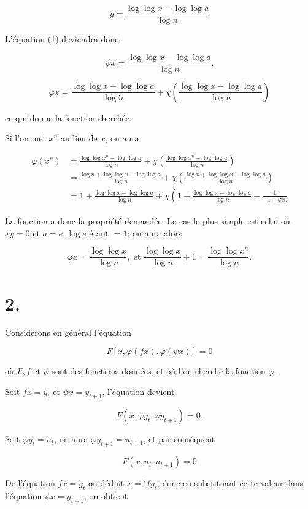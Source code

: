 \documentclass{article}
\begin{document}
\[
y=\frac{\log \log x-\log \log a}{\log n}
\]

L'équation (1) deviendra done

\[
\psi x=\frac{\log \log x-\log \log a}{\log n} .
\]

\[
\varphi x=\frac{\log \log x-\log \log a}{\log \dot{n}}+\chi\left(\frac{\log \log x-\log \log a}{\log n}\right)
\]

ce qui donne la fonction cherchée.

Si l'on met \(x^{n}\) au lieu de \(x\), on aura

\[
\begin{aligned}
\varphi\left(x^{n}\right) & =\frac{\log \log x^{n}-\log \log a}{\log n}+\chi\left(\frac{\log \log x^{n}-\log \log a}{\log n}\right) \\
& =\frac{\log n+\log \log x-\log \log a}{\log n}+\chi\left(\frac{\log n+\log \log x-\log \log a}{\log n}\right) \\
& =1+\frac{\log \log x-\log \log a}{\log n}+\chi\left(1+\frac{\log \log x-\log \log a}{\log n}-\frac{1}{-1+\varphi x .}\right.
\end{aligned}
\]

La fonction a donc la propriété demandée. Le cas le plus simple est celui où \(x y=0\) et \(a=e, \log e\) étaut \(=1\); on aura alors

\[
\varphi x=\frac{\log \log x}{\log n}, \text { et } \frac{\log \log x}{\log n}+1=\frac{\log \log x^{n}}{\log n} .
\]

\section*{2.}

Considérons en général l'équation

\[
F[x, \varphi(f x), \varphi(\psi x)]=0
\]

où \(F, f\) et \(\psi\) sont des fonctions données, et où l'on cherche la fonction \(\varphi\).

Soit \(f x=y_{t}\) et \(\psi x=y_{t+1}\), l'équation devient

\[
F\left(x, \varphi y_{t}, \varphi y_{t+1}\right)=0 .
\]

Soit \(\varphi y_{t}=u_{t}\), on aura \(\varphi y_{t+1}=u_{t+1}\), et par conséquent

\[
F\left(x, u_{t}, u_{t+1}\right)=0
\]

De l'équation \(f x=y_{t}\) on déduit \(x=' f y_{t}\); done en substituant cette valeur dans l'équation \(\psi x=y_{t+1}\), on obtient
\end{document}
